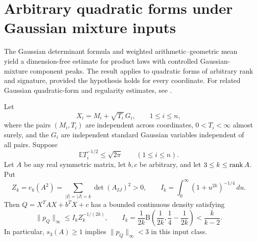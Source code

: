 \section{Arbitrary quadratic forms under Gaussian mixture inputs}\label{sec:gaussian-mixture}

The Gaussian determinant formula and weighted arithmetic--geometric mean yield a dimension-free estimate for product laws with controlled Gaussian-mixture component peaks. The result applies to quadratic forms of arbitrary rank and signature, provided the hypothesis holds for every coordinate. For related Gaussian quadratic-form and regularity estimates, see \citet{APSSS2017,GNSU2019,HMP2025}.

\begin{theorem}\label{gm:main}
Let
\[
 X_i=M_i+\sqrt{T_i}\,G_i,\qquad 1\le i\le n,
\]
where the pairs $(M_i,T_i)$ are independent across coordinates, $0<T_i<\infty$ almost surely, and the $G_i$ are independent standard Gaussian variables independent of all pairs. Suppose
\begin{equation}\label{gm:moment}
 \mathbb E T_i^{-1/2}\le\sqrt{2\pi}\qquad(1\le i\le n).
\end{equation}
Let $A$ be any real symmetric matrix, let $b,c$ be arbitrary, and let $3\le k\le\operatorname{rank} A$. Put
\[
 Z_k=e_k(A^2)=\sum_{|I|=|J|=k}\det(A_{IJ})^2>0,
 \qquad
 I_k=\int_0^\infty(1+u^{2k})^{-1/4}\,du.
\]
Then $Q=X^TAX+b^TX+c$ has a bounded continuous density satisfying
\begin{equation}\label{gm:density}
 \|p_Q\|_\infty\le I_k Z_k^{-1/(2k)},\qquad
 I_k=\frac1{2k}\mathrm B\!\left(\frac1{2k},\frac14-\frac1{2k}\right)
 <\frac{k}{k-2}.
\end{equation}
In particular, $s_3(A)\ge1$ implies $\|p_Q\|_\infty<3$ in this input class.
\end{theorem}

